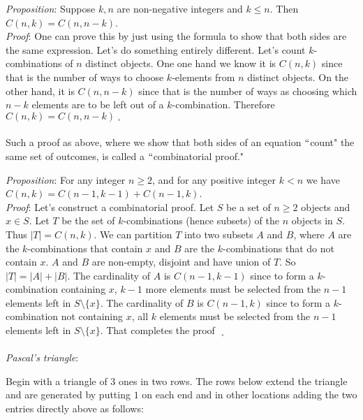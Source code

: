 \documentclass[12pt]{amsart}
\theoremstyle{definition}
\theoremstyle{remark}
\begin{document}
\emph{Proposition}:  Suppose $k,n$ are non-negative integers and $k\leq n$.  Then $C(n,k)=C(n,n-k)$.\\

\emph{Proof}:  One can prove this by just using the formula to show that both sides are the same expression.  Let's do something entirely different.  Let's count $k$-combinations of $n$ distinct objects.  One one hand we know it is $C(n,k)$ since that is the number of ways to choose $k$-elements from $n$ distinct objects.  On the other hand, it is $C(n,n-k)$ since that is the number of ways as choosing which $n-k$ elements are to be left out of a $k$-combination.  Therefore $C(n,k)=C(n,n-k)\;_{\square}$ \\ \\

Such a proof as above, where we show that both sides of an equation $``$count" the same set of outcomes, is called a $``$combinatorial proof."

\newpage

\emph{Proposition}:  For any integer $n\geq 2$, and for any positive integer $k<n$ we have \\$C(n,k)=C(n-1,k-1)+C(n-1,k)$.\\

\emph{Proof}:  Let's construct a combinatorial proof.  Let $S$ be a set of $n\geq 2$ objects and $x\in S$.  Let $T$ be the set of $k$-combinations (hence subsets) of the $n$ objects in $S$.  Thus $|T|=C(n,k)$.  We can partition $T$ into two subsets $A$ and $B$, where $A$ are the $k$-combinations that contain $x$ and $B$ are the $k$-combinations that do not contain $x$.  $A$ and $B$ are non-empty, disjoint and have union of $T$.  So $|T|=|A|+|B|$.  The cardinality of $A$ is $C(n-1,k-1)$ since to form a $k$-combination containing $x$, $k-1$ more elements must be selected from the $n-1$ elements left in $S\setminus\{x\}$.  The cardinality of $B$ is $C(n-1,k)$ since to form a $k$-combination not containing $x$, all $k$ elements must be selected from the $n-1$ elements left in $S\setminus\{x\}$.  That completes the proof$\mbox{ }_{\square}$ \\ \\


\emph{Pascal's triangle}:

\medskip

Begin with a triangle of $3$ ones in two rows.  The rows below extend the triangle and are generated by putting $1$ on each end and in other locations adding the two entries directly above as follows:
\end{document}
